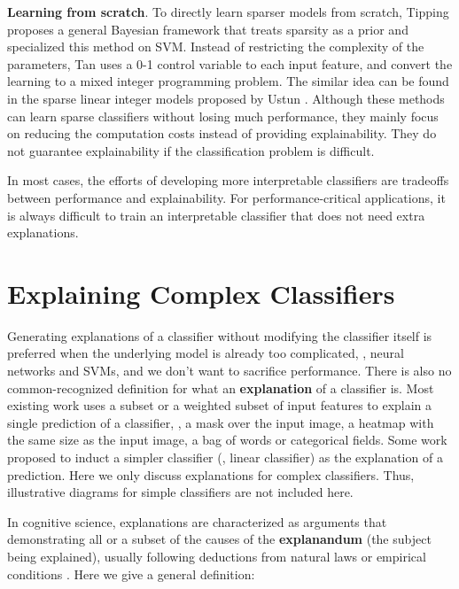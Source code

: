 \textbf{Learning from scratch}. To directly learn sparser models from scratch, Tipping \cite{tipping2001sparse} proposes a general Bayesian framework that treats sparsity as a prior and specialized this method on SVM. Instead of restricting the complexity of the parameters, Tan \etal \cite{tan2010sparsesvm} uses a 0-1 control variable to each input feature, and convert the learning to a mixed integer programming problem. The similar idea can be found in the sparse linear integer models proposed by Ustun \etal \cite{ustun2016supersparse}. Although these methods can learn sparse classifiers without losing much performance, they mainly focus on reducing the computation costs instead of providing explainability. They do not guarantee explainability if the classification problem is difficult.

In most cases, the efforts of developing more interpretable classifiers are tradeoffs between performance and explainability. For performance-critical applications, it is always difficult to train an interpretable classifier that does not need extra explanations.


\section{Explaining Complex Classifiers}

Generating explanations of a classifier without modifying the classifier itself is preferred when the underlying model is already too complicated, \eg, neural networks and SVMs, and we don't want to sacrifice performance. There is also no common-recognized definition for what an \textbf{explanation} of a classifier is. Most existing work uses a subset or a weighted subset of input features to explain a single prediction of a classifier, \eg, a mask over the input image, a heatmap with the same size as the input image, a bag of words or categorical fields. Some work \cite{ribeiro2016kdd} proposed to induct a simpler classifier (\eg, linear classifier) as the explanation of a prediction. Here we only discuss explanations for complex classifiers. Thus, illustrative diagrams for simple classifiers are not included here.

In cognitive science, explanations are characterized as arguments that demonstrating all or a subset of the causes of the \textbf{explanandum} (the subject being explained), usually following deductions from natural laws or empirical conditions \cite{hempel1948explanation,lombrozo2006explanation}. Here we give a general definition: 

